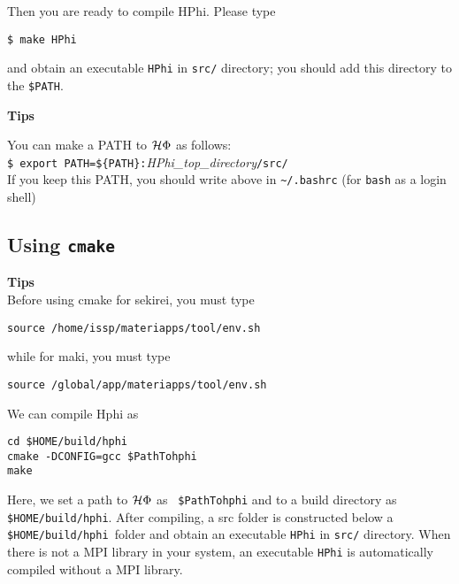 Then you are ready to compile HPhi.
Please type
\begin{verbatim}
$ make HPhi
\end{verbatim}
and obtain an executable \verb|HPhi| in \verb|src/| directory;
you should add this directory to the \verb|$PATH|.



\begin{screen}
\Large 
{\bf Tips}
\normalsize

You can make a PATH to $\mathcal{H} \Phi$ as follows:
\\
\verb|$ export PATH=${PATH}:|\textit{HPhi\_top\_directory}\verb|/src/|
\\
If you keep this PATH, you should write above in \verb|~/.bashrc|
(for \verb|bash| as a login shell)

\end{screen}


\subsection{Using \texttt{cmake}}

\begin{screen}
\Large 
{\bf Tips}
\normalsize\\
Before using cmake for sekirei, you must type 
\begin{verbatim}
source /home/issp/materiapps/tool/env.sh
\end{verbatim}
while for maki, you must type
\begin{verbatim}
source /global/app/materiapps/tool/env.sh
\end{verbatim}
\end{screen}

We can compile Hphi as
\begin{verbatim}
cd $HOME/build/hphi
cmake -DCONFIG=gcc $PathTohphi
make
\end{verbatim}
Here, we set a path to $\mathcal{H} \Phi$ as \verb| $PathTohphi| and to a build directory as \verb| $HOME/build/hphi|. After compiling, a src folder is constructed below a \verb| $HOME/build/hphi |folder and obtain an executable \verb|HPhi| in \verb|src/| directory. When there is not a MPI library in your system, an executable \verb|HPhi| is automatically compiled without a MPI library.

